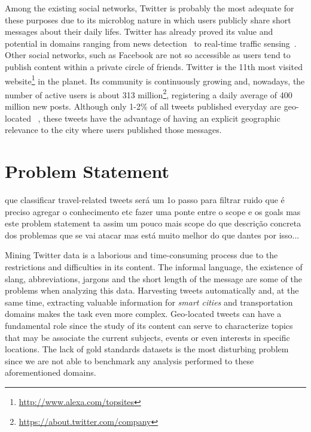 Among the existing social networks, Twitter is probably the most adequate for these purposes due to its microblog nature in which users publicly share short messages about their daily lifes. Twitter has already proved its value and potential in domains ranging from news detection~\cite{sankaranarayanan2009twitterstand} to real-time traffic sensing~\cite{carvalho2010real}. Other social networks, such as Facebook are not so accessible as users tend to publish content within a private circle of friends. Twitter is the 11th most visited website\footnote{\url{http://www.alexa.com/topsites}} in the planet. Its community is continuously growing and, nowadays, the number of active users is about 313 million\footnote{\url{https://about.twitter.com/company}}, registering a daily average of 400 million new posts. Although only 1-2\% of all tweets published everyday are geo-located ~\cite{ikeda2013twitter}, these tweets have the advantage of having an explicit geographic relevance to the city where users published those messages.

\section{Problem Statement}\label{sec:problem}

que classificar travel-related tweets será um 1o passo para filtrar ruido
que é preciso agregar o conhecimento
etc
fazer uma ponte entre o scope e os goals
mas este problem statement ta assim um pouco mais scope do que descrição concreta dos problemas que se vai atacar
mas está muito melhor do que dantes
por isso...


Mining Twitter data is a laborious and time-consuming process due to the restrictions and difficulties in its content. The informal language, the existence of slang, abbreviations, jargons and the short length of the message are some of the problems when analyzing this data. Harvesting tweets automatically and, at the same time, extracting valuable information for \textit{smart cities} and transportation domains makes the task even more complex. Geo-located tweets can have a fundamental role since the 
study of its content can serve to characterize topics that may be associate the current subjects, events or even interests in specific locations.
The lack of gold standards datasets is the most disturbing problem since we are not able to benchmark any analysis performed to these aforementioned domains.

